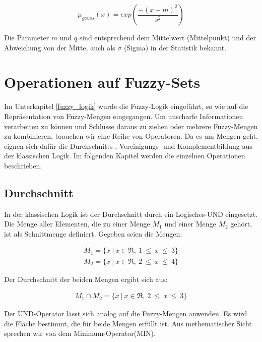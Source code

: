 \begin{equation}
\mu_{gauss}(x) = exp(\frac{-(x - m)^2}{s^2})
\label{gauss_mf}
\end{equation}

Die Parameter $m$ und $q$ sind entsprechend dem Mittelwert (Mittelpunkt) und der Abweichung von der Mitte, auch als $\sigma$ (Sigma) in der Statistik bekannt.




%
%

\section{Operationen auf Fuzzy-Sets} \label{operatoren}
Im Unterkapitel \ref{fuzzy_logik} wurde die Fuzzy-Logik eingeführt, so wie auf die Repräsentation von Fuzzy-Mengen eingegangen. Um unscharfe Informationen verarbeiten zu können und Schlüsse daraus zu ziehen oder mehrere Fuzzy-Mengen zu kombinieren, brauchen wir eine Reihe von Operatoren. Da es um Mengen geht, eignen sich dafür die Durchschnitts-, Vereinigungs- und Komplementbildung aus der klassischen Logik. Im folgenden Kapitel werden die einzelnen Operationen beschrieben.
\subsection{Durchschnitt}\label{AND}

In der klassischen Logik ist der Durchschnitt durch ein Logisches-UND eingesetzt. Die Menge aller Elementen, die zu einer Menge $M_1$ und einer Menge $M_2$ gehört,  ist als Schnittmenge definiert. Gegeben seien die Mengen:

\begin{align}
M_1 = \{ x \ | \ x \in\Re, \ 1 \ \leq \ x \ \leq \ 3 \} 
\end{align}
\begin{align}
M_2 = \{ x \ | \ x \in\Re, \ 2 \ \leq \ x \ \leq \ 4 \} 
\end{align}

Der Durchschnitt der beiden Mengen ergibt sich aus:

\begin{align}
M_1 \cap M_2 = \{ x \ | \ x \in \Re, \ 2 \ \leq \ x \ \leq \ 3 \}
\end{align} 

Der UND-Operator lässt sich analog auf die Fuzzy-Mengen anwenden. Es wird die Fläche bestimmt, die für beide Mengen erfüllt ist. Aus methematischer Sicht sprechen wir von dem Minimum-Operator(MIN).

